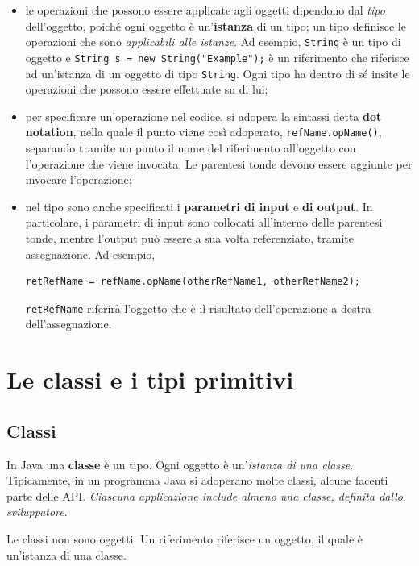 \documentclass[\fontsizeclass,twocolumn]{\classname}
\theoremstyle{definition}
\theoremstyle{definition}
\begin{document}
\begin{itemize}
	\item le operazioni che possono essere applicate agli oggetti dipendono
		dal \emph{tipo} dell'oggetto, poiché ogni oggetto è
		un'\textbf{istanza} di un tipo; un tipo definisce le operazioni
		che sono \emph{applicabili alle istanze}. Ad esempio, \texttt{String} è
		un tipo di oggetto e \texttt{String s = new String("Example");} è un
		riferimento che riferisce ad un'istanza di un oggetto di tipo
		\texttt{String}. Ogni tipo ha dentro di sé insite le operazioni che
		possono essere effettuate su di lui;
	\item per specificare un'operazione nel codice, si adopera la sintassi
		detta \textbf{dot notation}, nella quale il punto viene così
		adoperato, \texttt{refName.opName()}, separando tramite un punto il nome del
		riferimento all'oggetto con l'operazione che viene invocata. Le
		parentesi tonde devono essere aggiunte per invocare
		l'operazione;
	\item nel tipo sono anche specificati i \textbf{parametri di input} e
		\textbf{di output}. In particolare, i parametri di input sono
		collocati all'interno delle parentesi tonde, mentre l'output
		può essere a sua volta referenziato, tramite assegnazione. Ad
		esempio,

		\begin{lstlisting}
retRefName = refName.opName(otherRefName1, otherRefName2);
		\end{lstlisting}

		\texttt{retRefName} riferirà l'oggetto che è il risultato
		dell'operazione a destra dell'assegnazione.
\end{itemize}


\section{Le classi e i tipi primitivi}

\subsection{Classi}

In Java una \textbf{classe} è un tipo. Ogni oggetto è un'\emph{istanza di una
classe}. Tipicamente, in un programma Java si adoperano molte classi, alcune
facenti parte delle API. \emph{Ciascuna applicazione include almeno una classe,
definita dallo sviluppatore}.

Le classi non sono oggetti. Un riferimento riferisce un oggetto, il quale è
un'istanza di una classe.
\end{document}
